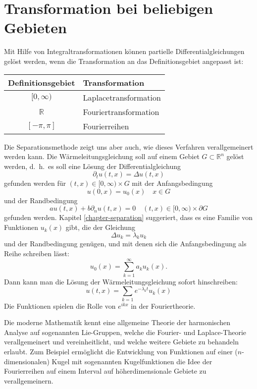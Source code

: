 \section{Transformation bei beliebigen Gebieten}
Mit Hilfe von Integraltransformationen können partielle
Differentialgleichungen  gelöst werden, wenn die Transformation
an das Definitionsgebiet angepasst ist:
\begin{center}
\begin{tabular}{cl}
Definitionsgebiet&Transformation\\
\hline
$[0,\infty)$&Laplacetransformation\\
$\mathbb R$&Fouriertransformation\\
$[-\pi,\pi]$&Fourierreihen
\end{tabular}
\end{center}
Die Separationsmethode zeigt uns aber auch, wie dieses 
Verfahren verallgemeinert werden kann. Die Wärmeleitungsgleichung
soll auf einem Gebiet $G\subset \mathbb R^n$ gelöst werden, d.~h.~es
soll eine Lösung der Differentialgleichung
\[
\partial_t u(t,x)=\Delta u(t,x)
\]
gefunden werden für $(t,x)\in [0,\infty)\times G$ mit der Anfangsbedingung
\[
u(0,x)=u_0(x) \quad x\in G
\]
und der Randbedingung
\[
au(t,x)+b\partial_nu(t,x)=0\quad (t,x)\in[0,\infty)\times \partial G
\]
gefunden werden. Kapitel \ref{chapter-separation} suggeriert, dass
es eine Familie von Funktionen $u_k(x)$ gibt, die der Gleichung
\[
\Delta u_k=\lambda_k u_k
\]
und der Randbedingung genügen, und mit denen sich die 
Anfangsbedingung als Reihe schreiben lässt:
\[
u_0(x)=\sum_{k=1}^\infty a_ku_k(x).
\]
Dann kann man die Lösung der Wärmeleitungsgleichung sofort
hinschreiben:
\[
u(t,x)=\sum_{k=1}e^{-\lambda_kt}u_k(x)
\]
Die Funktionen spielen die Rolle von $e^{ikx}$ in der Fouriertheorie.

Die moderne Mathematik kennt eine allgemeine Theorie der harmonischen
Analyse auf sogenannten Lie-Gruppen, welche die Fourier- und 
Laplace-Theorie verallgemeinert und vereinheitlicht, und welche
weitere Gebiete zu behandeln erlaubt. Zum Beispiel ermöglicht
die Entwicklung von Funktionen auf einer ($n$-dimensionalen)
Kugel mit sogenannten Kugelfunktionen die Idee der Fourierreihen
auf einem Interval auf höherdimensionale Gebiete zu verallgemeinern.

